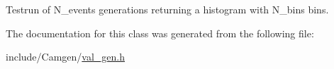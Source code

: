 Testrun of N\+\_\+events generations returning a histogram with N\+\_\+bins bins. 



The documentation for this class was generated from the following file\+:\begin{DoxyCompactItemize}
\item 
include/\+Camgen/\hyperlink{a00828}{val\+\_\+gen.\+h}\end{DoxyCompactItemize}
